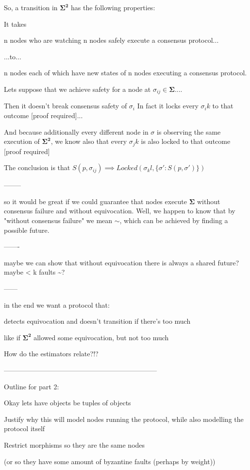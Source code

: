 \documentclass{article}
\theoremstyle{definition}
\newcommand{\cat}{
	\mathbf
}
\begin{document}
So, a transition in $\cat{\Sigma^2}$ has the following properties:

It takes

n nodes who are watching n nodes safely execute a consensus protocol...

...to...

n nodes each of which have new states of n nodes executing a consensus protocol.



Lets suppose that we achieve safety for a node at $\sigma_{ij} \in \cat{\Sigma}$....

Then it doesn't break consensus safety of $\sigma_i$
In fact it locks every $\sigma_ik$ to that outcome [proof required]...

And because additionally every different node in $\sigma$ is observing the same execution of $\cat{\Sigma^2}$, we know also that every $\sigma_jk$ is also locked to that outcome [proof required]

The conclusion is that $S(p,\sigma_{ij}) \implies Locked(\sigma_kl, \{\sigma': S(p,\sigma')\})$

--------

so it would be great if we could guarantee that nodes execute $\cat{\Sigma}$ without consensus failure and without equivocation. Well, we happen to know that by "without consensus failure" we mean $\sim$, which can be achieved by finding a possible future.

-------

maybe we can show that without equivocation there is always a shared future?
maybe < k faults \implies \sim?


------

in the end we want a protocol that:

detects equivocation and doesn't transition if there's too much

like if $\cat{\Sigma^2}$ allowed some equivocation, but not too much


How do the estimators relate?!?


--------------------------------------------------------------------

Outline for part 2:

Okay lets have objects be tuples of objects

Justify why this will model nodes running the protocol, while also modelling the protocol itself

Restrict morphisms so they are the same nodes

(or so they have some amount of byzantine faults (perhaps by weight))
\end{document}
